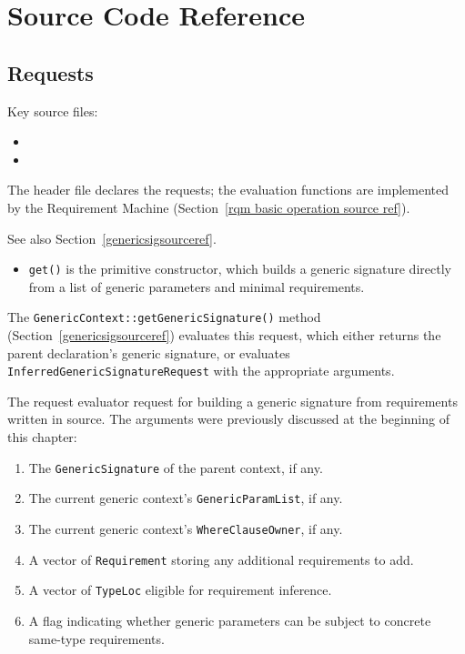 \documentclass[../generics]{subfiles}
\begin{document}
\section{Source Code Reference}\label{buildinggensigsourceref}

\subsection*{Requests}

Key source files:
\begin{itemize}
\item {}
\item {}
\end{itemize}

The header file declares the requests; the evaluation functions are implemented by the Requirement Machine (Section~\ref{rqm basic operation source ref}).

See also Section~\ref{genericsigsourceref}.
\begin{itemize}
\item \texttt{get()} is the primitive constructor, which builds a generic signature directly from a list of generic parameters and minimal requirements.
\end{itemize}

The \texttt{GenericContext::getGenericSignature()} method (Section~\ref{genericsigsourceref}) evaluates this request, which either returns the parent declaration's generic signature, or evaluates \texttt{InferredGenericSignatureRequest} with the appropriate arguments.

The request evaluator request for building a generic signature from requirements written in source. The arguments were previously discussed at the beginning of this chapter:
\begin{enumerate}
\item The \texttt{GenericSignature} of the parent context, if any.
\item The current generic context's \texttt{GenericParamList}, if any.
\item The current generic context's \texttt{WhereClauseOwner}, if any.
\item A vector of \texttt{Requirement} storing any additional requirements to add.
\item A vector of \texttt{TypeLoc} eligible for requirement inference.
\item A flag indicating whether generic parameters can be subject to concrete same-type requirements.
\end{enumerate}
\end{document}
